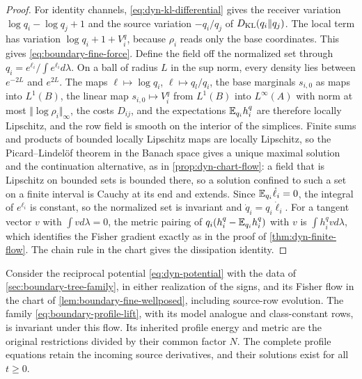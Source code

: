 \begin{proof}
For identity channels, \cref{eq:dyn-kl-differential} gives the receiver variation $\log q_i-\log q_j+1$ and the source variation $-q_i/q_j$ of $D_{\mathrm{KL}}(q_i\Vert q_j)$. The local term has variation $\log q_i+1+V_i^q$, because $\rho_i$ reads only the base coordinates. This gives \cref{eq:boundary-fine-force}. Define the field off the normalized set through $q_i=e^{\ell_i}/\int e^{\ell_i}d\lambda$. On a ball of radius $L$ in the sup norm, every density lies between $e^{-2L}$ and $e^{2L}$. The maps $\ell\mapsto\log q_i$, $\ell\mapsto q_l/q_i$, the base marginals $s_{i,0}$ as maps into $L^1(B)$, the linear map $s_{i,0}\mapsto V_i^q$ from $L^1(B)$ into $L^\infty(A)$ with norm at most $\Vert\log\rho_i\Vert_\infty$, the costs $D_{ij}$, and the expectations $\mathbb E_{q_i}h_i^q$ are therefore locally Lipschitz, and the row field is smooth on the interior of the simplices. Finite sums and products of bounded locally Lipschitz maps are locally Lipschitz, so the Picard--Lindel\"of theorem in the Banach space gives a unique maximal solution and the continuation alternative, as in \cref{prop:dyn-chart-flow}: a field that is Lipschitz on bounded sets is bounded there, so a solution confined to such a set on a finite interval is Cauchy at its end and extends. Since $\mathbb E_{q_i}\dot\ell_i=0$, the integral of $e^{\ell_i}$ is constant, so the normalized set is invariant and $\dot q_i=q_i\dot\ell_i$. For a tangent vector $v$ with $\int v d\lambda=0$, the metric pairing of $q_i(h_i^q-\mathbb E_{q_i}h_i^q)$ with $v$ is $\int h_i^qv d\lambda$, which identifies the Fisher gradient exactly as in the proof of \cref{thm:dyn-finite-flow}. The chain rule in the chart gives the dissipation identity.
\end{proof}

Consider the reciprocal potential \cref{eq:dyn-potential} with the data of \cref{sec:boundary-tree-family}, in either realization of the signs, and its Fisher flow in the chart of \cref{lem:boundary-fine-wellposed}, including source-row evolution. The family \cref{eq:boundary-profile-lift}, with its model analogue and class-constant rows, is invariant under this flow. Its inherited profile energy and metric are the original restrictions divided by their common factor $N$. The complete profile equations retain the incoming source derivatives, and their solutions exist for all $t\ge0$.

